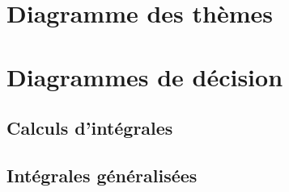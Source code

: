 \begin{subappendices}



\section{Diagramme des thèmes}
\begin{figure}[t]
    
\end{figure}

\section{Diagrammes de décision}
\subsection{Calculs d'intégrales}

\subsection{Intégrales généralisées}




\end{subappendices}
